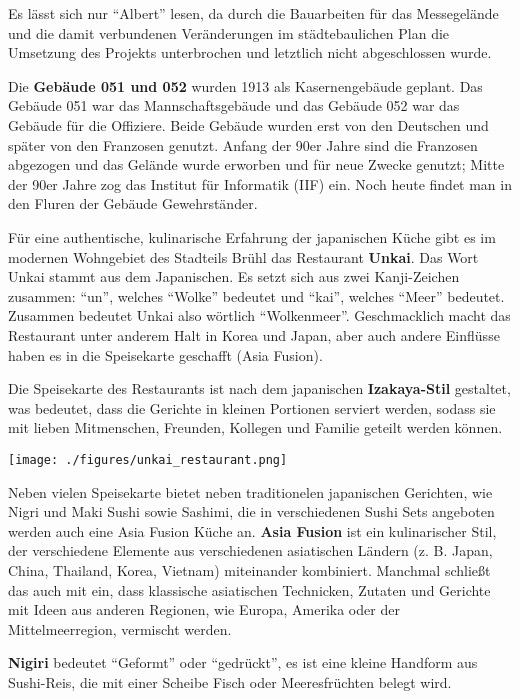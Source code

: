 \documentclass[landscape, a4paper]{article}
\newcommand\alert[1]{\textcolor{PrimaryColor}{\textbf{#1}}}
\begin{document}
\hspace{0.4cm}
\begin{minipage}[t]{0.32\textwidth}
	\vspace{0cm}
	\setlength{\parskip}{0.25cm}

 Es lässt sich nur \enquote{Albert} lesen, da durch die Bauarbeiten für das Messegelände und die damit verbundenen Veränderungen im städtebaulichen Plan die Umsetzung des Projekts unterbrochen und letztlich nicht abgeschlossen wurde.

  Die \alert{Gebäude 051 und 052} wurden 1913 als Kasernengebäude geplant. Das Gebäude 051 war das Mannschaftsgebäude und das Gebäude 052 war das Gebäude für die Offiziere. Beide Gebäude wurden erst von den Deutschen und später von den Franzosen genutzt. Anfang der 90er Jahre sind die Franzosen abgezogen und das Gelände wurde erworben und für neue Zwecke genutzt; Mitte der 90er Jahre zog das Institut für Informatik (IIF) ein. Noch heute findet man in den Fluren der Gebäude Gewehrständer.

  Für eine authentische, kulinarische Erfahrung der japanischen Küche gibt es im modernen Wohngebiet des Stadteils Brühl das Restaurant \alert{Unkai}. Das Wort Unkai stammt aus dem Japanischen. Es setzt sich aus zwei Kanji-Zeichen zusammen: \enquote{un}, welches \enquote{Wolke} bedeutet und \enquote{kai}, welches \enquote{Meer} bedeutet. Zusammen bedeutet Unkai also wörtlich \enquote{Wolkenmeer}. Geschmacklich macht das Restaurant unter anderem Halt in Korea und Japan, aber auch andere Einflüsse haben es in die Speisekarte geschafft (Asia Fusion). 

  Die Speisekarte des Restaurants ist nach dem japanischen \alert{Izakaya-Stil} gestaltet, was bedeutet, dass die Gerichte in kleinen Portionen serviert werden, sodass sie mit lieben Mitmenschen, Freunden, Kollegen und Familie geteilt werden können. %

	\texttt{[image: ./figures/unkai\_restaurant.png]}
	\setlength{\parskip}{0.25cm}

  Neben vielen Speisekarte bietet neben traditionelen japanischen Gerichten, wie Nigri und Maki Sushi sowie Sashimi, die in verschiedenen Sushi Sets angeboten werden auch eine Asia Fusion Küche an. \alert{Asia Fusion} ist ein kulinarischer Stil, der verschiedene Elemente aus verschiedenen asiatischen Ländern (z. B. Japan, China, Thailand, Korea, Vietnam) miteinander kombiniert. Manchmal schließt das auch mit ein, dass klassische asiatischen Technicken, Zutaten und Gerichte mit Ideen aus anderen Regionen, wie Europa, Amerika oder der Mittelmeerregion, vermischt werden.

  \alert{Nigiri} bedeutet \enquote{Geformt} oder \enquote{gedrückt}, es ist eine kleine Handform aus Sushi-Reis, die mit einer Scheibe Fisch oder Meeresfrüchten belegt wird.
\end{minipage}
\end{document}
